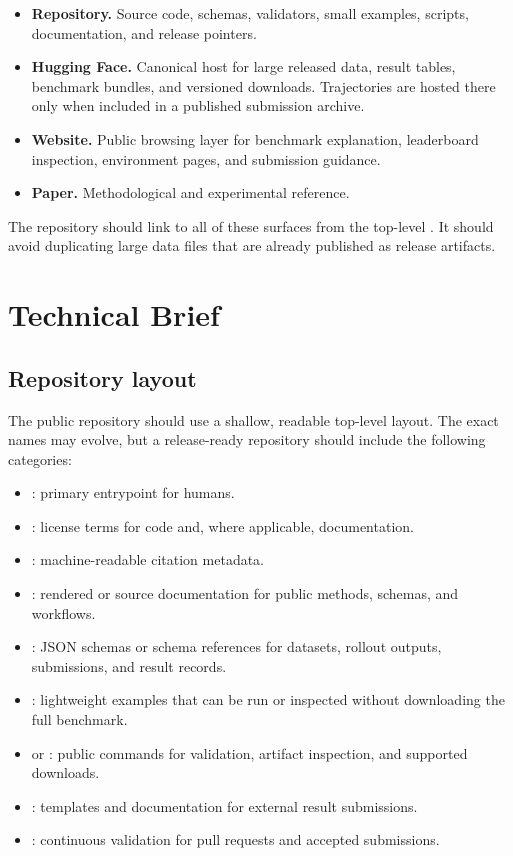 \documentclass[11pt]{article}
\begin{document}
\begin{itemize}
\item \textbf{Repository.} Source code, schemas, validators, small examples, scripts, documentation, and release pointers.
\item \textbf{Hugging Face.} Canonical host for large released data, result tables, benchmark bundles, and versioned downloads. Trajectories are hosted there only when included in a published submission archive.
\item \textbf{Website.} Public browsing layer for benchmark explanation, leaderboard inspection, environment pages, and submission guidance.
\item \textbf{Paper.} Methodological and experimental reference.
\end{itemize}

The repository should link to all of these surfaces from the top-level .
It should avoid duplicating large data files that are already published as release artifacts.

\label{sec:public-repository-public-promise}

\section*{Technical Brief}

\label{sec:public-repository-layout}
\subsection*{Repository layout}

The public repository should use a shallow, readable top-level layout.
The exact names may evolve, but a release-ready repository should include the following categories:

\begin{itemize}
\item {}: primary entrypoint for humans.
\item {}: license terms for code and, where applicable, documentation.
\item {}: machine-readable citation metadata.
\item {}: rendered or source documentation for public methods, schemas, and workflows.
\item {}: JSON schemas or schema references for datasets, rollout outputs, submissions, and result records.
\item {}: lightweight examples that can be run or inspected without downloading the full benchmark.
\item {} or : public commands for validation, artifact inspection, and supported downloads.
\item {}: templates and documentation for external result submissions.
\item {}: continuous validation for pull requests and accepted submissions.
\end{itemize}
\end{document}
